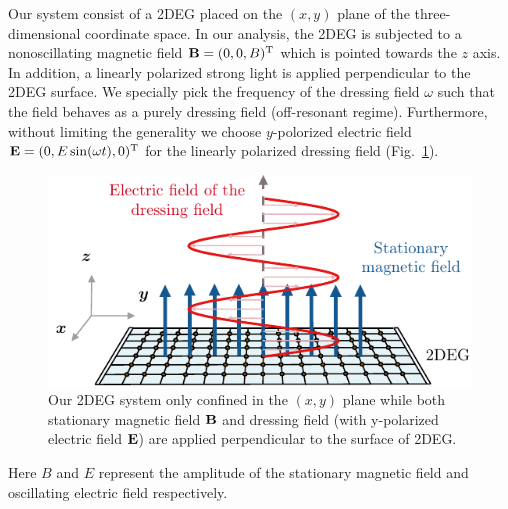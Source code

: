 
Our system consist of a 2DEG placed on the $(x,y)$ plane of the three-dimensional coordinate space. In our analysis, the 2DEG is subjected to a nonoscillating magnetic field $\vb{B} = (0,0,B)^{\text{T}}$ which is pointed towards the $z$ axis. In addition, a linearly polarized strong light is applied perpendicular to the 2DEG surface. We specially pick the frequency of the dressing field $\omega$ such that the field behaves as a purely dressing field (off-resonant regime). Furthermore, without limiting the generality we choose $y$-polorized electric field $\vb{E} = (0,E\sin(\omega t),0)^{\text{T}}$ for the linearly polarized dressing field (Fig.~\ref{fig_1}).
\begin{figure}[b]
\includegraphics[scale=0.9]{figures/fig_1}
\caption{\label{fig_1} Our 2DEG system only confined in the $(x,y)$ plane while both stationary magnetic field $\vb{B}$ and dressing field (with y-polarized electric field $\vb{E}$) are applied perpendicular to the surface of 2DEG.}
\end{figure}
Here $B$ and $E$ represent the amplitude of the stationary magnetic field and oscillating electric field respectively.

